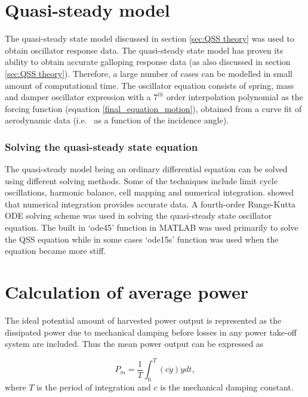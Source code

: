 \section{Quasi-steady model}
\label{sec:QSS_model_methodology}

The quasi-steady state model discussed in section \ref{sec:QSS theory} was used to obtain oscillator response data. The quasi-steady state model has proven its ability to obtain accurate galloping response data (as also discussed in section \ref{sec:QSS theory}). Therefore, a large number of cases can be modelled in small amount of computational time. The oscillator equation consists of spring, mass and damper oscillator expression with a $7^{th}$ order interpolation polynomial as the forcing function (equation \ref{final_equation_motion}), obtained from a curve fit of aerodynamic data (i.e. \cy\ as a function of the incidence angle).

\subsubsection{Solving the quasi-steady state equation}

The quasi-steady model being an ordinary differential equation can be solved using different solving methods. Some of the techniques include limit cycle oscillations, harmonic balance, cell mapping and numerical integration. \citet{Vio2007} showed that numerical integration provides accurate data. A fourth-order Runge-Kutta ODE solving scheme was used in solving the quasi-steady state oscillator equation. The built in `ode45' function in MATLAB was used primarily to solve the QSS equation while in some cases `ode15s' function was used when the equation became more stiff.


\section{Calculation of average power}
\label{subsec:ave_pow}
The ideal potential amount of harvested power output is represented as the dissipated power due to mechanical damping before losses in any power take-off system are included. Thus the mean power output can be expressed as 


\begin{equation}
\label{eqn:power}
P_{m}=\frac{1}{T}\int_{0}^{T}(c\dot{y})\dot{y} dt,
\end{equation}
where $T$ is the period of integration and $c$ is the mechanical damping constant. 

